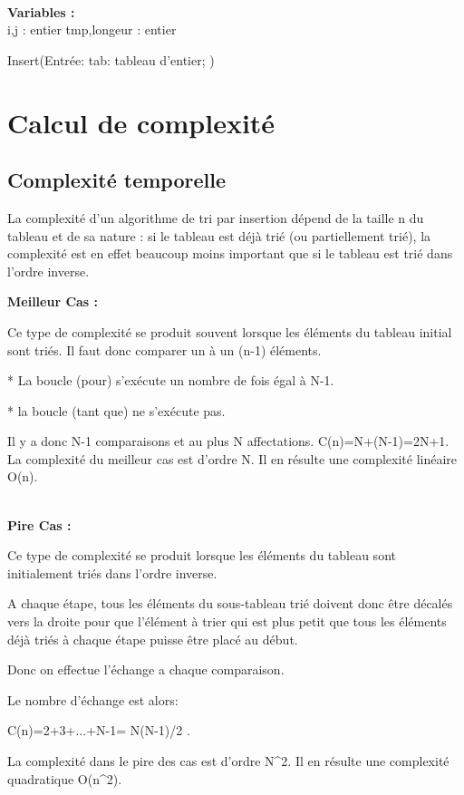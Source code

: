 \\
\par
\begin{function}[H]
    \textbf{Variables :}\\
    i,j : entier\;
    tmp,longeur : entier\;
    
    
    \caption{Insert(Entrée: tab: tableau d'entier; )}
\end{function}


\section{Calcul de complexité}
\subsection{Complexité temporelle}
\par
La complexité d’un algorithme de tri par insertion dépend de la taille n du tableau et de sa nature : si le tableau est déjà trié (ou partiellement trié), la complexité est en effet beaucoup moins important que si le tableau est trié dans l’ordre inverse.
\par
\textbf{Meilleur Cas :}
\par
Ce type de complexité se produit souvent lorsque les éléments du tableau initial sont triés.
 Il faut donc comparer un à un (n-1) éléments.
 \par
* La boucle (pour) s'exécute un nombre de fois égal à N-1.
\par
* la boucle (tant que)  ne s'exécute pas.

\par
Il y a donc N-1 comparaisons et au plus N affectations.
C(n)=N+(N-1)=2N+1.
La complexité du meilleur cas est d'ordre N. Il en résulte une complexité linéaire O(n).

\\
\textbf{Pire Cas :}
\par
Ce type de complexité se produit lorsque les éléments du tableau sont initialement triés dans l’ordre inverse.
\par
A chaque étape, tous les éléments du sous-tableau trié doivent donc être décalés vers la droite pour que l'élément à trier qui est plus petit que tous les éléments déjà triés à chaque étape puisse être placé au  début.
\par
Donc  on effectue l'échange a chaque comparaison.
\par
Le nombre d’échange est alors:
\par
C(n)=2+3+...+N-1= N(N-1)/2 .
\par
La complexité dans le pire des cas est d'ordre N^2. Il en résulte une complexité quadratique  O(n^2).
\par

